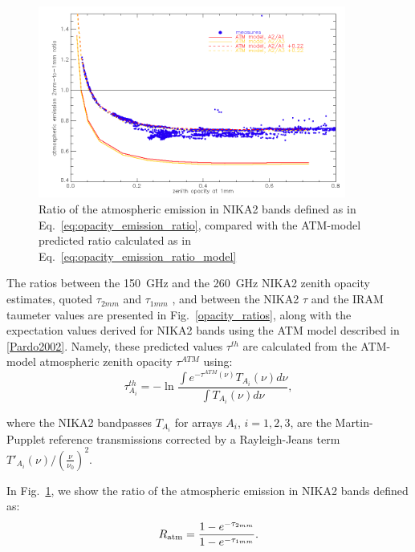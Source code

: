 \begin{figure}[ht]
\begin{center}
\includegraphics[width=0.9\textwidth]{Figures/opacity_tau1_tau2_emissionratio_N2R9_N2R10.png}
\caption[Emission opacity ratio]{Ratio of the atmospheric emission in NIKA2 bands defined as
  in Eq.~\ref{eq:opacity_emission_ratio}, compared with the ATM-model
  predicted ratio calculated as in Eq.~\ref{eq:opacity_emission_ratio_model}}
  \label{fig:opacity_emission}
\end{center}
\end{figure}

The ratios between the 150~GHz and the 260~GHz NIKA2 zenith opacity
estimates, quoted $\tau_{2mm}$ and $\tau_{1mm}$ , and
between the NIKA2 $\tau$ and the IRAM taumeter values are presented in
Fig.~\ref{opacity_ratios}, along with the expectation values derived for NIKA2 bands
using the ATM model described in \ref{Pardo2002}. Namely, these
predicted values $\tau^{th}$ are calculated from the ATM-model
atmospheric zenith opacity $\tau^{ATM}$ using:  
\begin{equation}
  \tau^{th}_{A_i} = - \ln{\frac{\int e^{-\tau^{ATM}(\nu)}
      T_{A_i}(\nu) d\nu}{ \int T_{A_i}(\nu) d\nu}},
\end{equation}

where the NIKA2 bandpasses $T_{A_i}$ for arrays $A_i$, $i=1, 2, 3$, are the Martin-Pupplet reference transmissions
corrected by a Rayleigh-Jeans term  $T'_{A_i}(\nu) /
\left( \frac{\nu}{\nu_0}\right)^2$. 

In Fig.~\ref{fig:opacity_emission}, we
show the ratio of the atmospheric emission in NIKA2 bands defined as:
\begin{equation}
  R_{\rm{atm}} = \frac{1-e^{-\tau_{2mm}}}{1-e^{-\tau_{1mm}}}.
    \label{eq:opacity_emission_ratio}
\end{equation}

